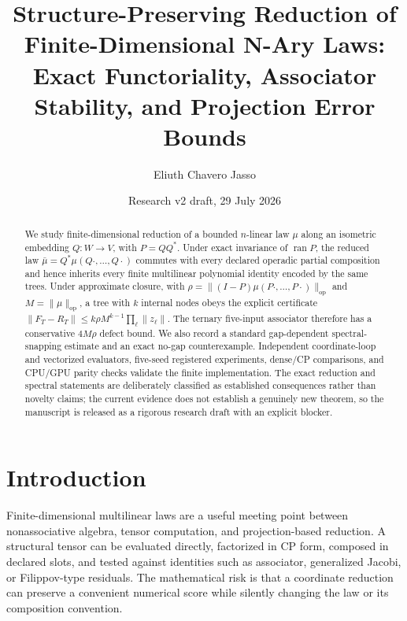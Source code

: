 \documentclass[11pt]{amsart}
\title[Structure-preserving reduction of finite-dimensional n-ary laws]{Structure-Preserving Reduction of Finite-Dimensional N-Ary Laws:\\
Exact Functoriality, Associator Stability, and Projection Error Bounds}
\author{Eliuth Chavero Jasso}
\date{Research v2 draft, 29 July 2026}
\theoremstyle{definition}
\newcommand{\ran}{\operatorname{ran}}
\newcommand{\op}{\operatorname{op}}
\begin{document}
\begin{abstract}
We study finite-dimensional reduction of a bounded \(n\)-linear law \(\mu\) along an isometric embedding \(Q:W\to V\), with \(P=QQ^*\). Under exact invariance of \(\ran P\), the reduced law \(\bar\mu=Q^*\mu(Q\cdot,\ldots,Q\cdot)\) commutes with every declared operadic partial composition and hence inherits every finite multilinear polynomial identity encoded by the same trees. Under approximate closure, with \(\rho=\|(I-P)\mu(P\cdot,\ldots,P\cdot)\|_{\op}\) and \(M=\|\mu\|_{\op}\), a tree with \(k\) internal nodes obeys the explicit certificate \(\|F_T-R_T\|\leq k\rho M^{k-1}\prod_\ell\|z_\ell\|\). The ternary five-input associator therefore has a conservative \(4M\rho\) defect bound. We also record a standard gap-dependent spectral-snapping estimate and an exact no-gap counterexample. Independent coordinate-loop and vectorized evaluators, five-seed registered experiments, dense/CP comparisons, and CPU/GPU parity checks validate the finite implementation. The exact reduction and spectral statements are deliberately classified as established consequences rather than novelty claims; the current evidence does not establish a genuinely new theorem, so the manuscript is released as a rigorous research draft with an explicit blocker.
\end{abstract}


\maketitle

\section{Introduction}

Finite-dimensional multilinear laws are a useful meeting point between nonassociative algebra, tensor computation, and projection-based reduction. A structural tensor can be evaluated directly, factorized in CP form, composed in declared slots, and tested against identities such as associator, generalized Jacobi, or Filippov-type residuals. The mathematical risk is that a coordinate reduction can preserve a convenient numerical score while silently changing the law or its composition convention.
\end{document}
